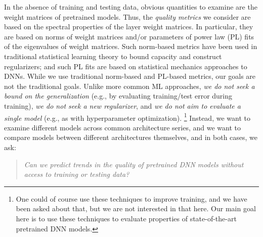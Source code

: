 In the absence of training and testing data, obvious quantities to examine are the weight matrices of pretrained models.
Thus,
the \emph{quality metrics} we consider are based on the spectral properties of the layer weight matrices.
In particular, they are based on norms of weight matrices 
and/or parameters of power law (PL) fits of the eigenvalues of weight matrices.
Such norm-based metrics have been used in traditional statistical learning theory to bound capacity and construct regularizers; and such PL fits are based on statistical mechanics approaches to DNNs.
While we use traditional norm-based and PL-based metrics, our goals are not the traditional goals.
Unlike more common ML approaches, \emph{we do not seek a bound on the generalization} (e.g., by evaluating training/test error during training), \emph{we do not seek a new regularizer}, and \emph{we do not aim to evaluate a single model} (e.g., as with hyperparameter optimization).%
\footnote{One could of course use these techniques to improve training, and we have been asked about that, but we are not interested in that here. Our main goal here is to use these techniques to evaluate properties of state-of-the-art pretrained DNN models.}
Instead, we want to examine different models across common architecture series, and we want to compare models between different architectures themselves, and in both cases, we ask:
\begin{quote}
\emph{Can we predict trends in the quality of pretrained DNN models without access to training or testing data?}  
\end{quote}




